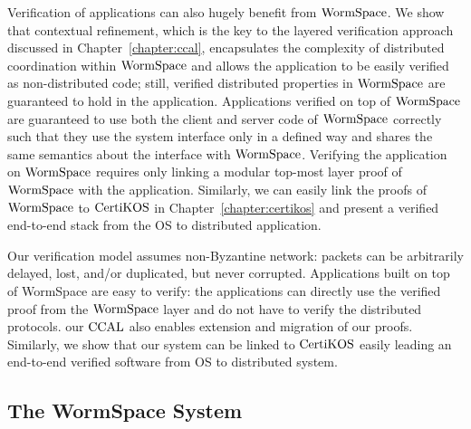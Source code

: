 Verification of applications can also hugely benefit from $\mathrm{WormSpace}$. We show that contextual refinement, which is the key to the layered verification approach discussed in Chapter~\ref{chapter:ccal}, encapsulates the complexity of distributed coordination within $\mathrm{WormSpace}$ and allows the application to be easily verified as non-distributed code; still, verified distributed properties in $\mathrm{WormSpace}$ are guaranteed to hold in the application. Applications verified on top of $\mathrm{WormSpace}$ are guaranteed to use both the client and server code of $\mathrm{WormSpace}$ correctly such that they use the system interface only in a defined way and shares the same semantics about the interface with $\mathrm{WormSpace}$. Verifying the application on $\mathrm{WormSpace}$ requires only linking a modular top-most layer proof of $\mathrm{WormSpace}$ with the application. Similarly, we can easily link the proofs of $\mathrm{WormSpace}$ to $\mathrm{CertiKOS}$ in Chapter~\ref{chapter:certikos} and present a verified end-to-end stack from the OS to distributed application.

Our verification model assumes non-Byzantine network: packets can be arbitrarily delayed, lost, and/or duplicated, but never corrupted. Applications built on top of WormSpace are easy to verify: the applications can directly use the verified proof from the $\mathrm{WormSpace}$ layer and do not have to verify the distributed protocols. our $\mathrm{CCAL}$ also enables extension and migration of our proofs. Similarly, we show that our system can be linked to $\mathrm{CertiKOS}$ easily leading an end-to-end verified software from OS to distributed system.
%


\subsection{The WormSpace System}
\label{chapter:wormspace:subsec:wormspace-system}

